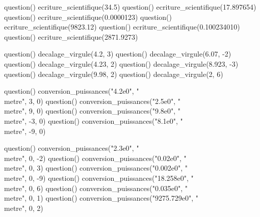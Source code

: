 \documentclass[../Cours.tex]{subfiles}
\begin{document}
\clearpage
\CORRECTIONS
\begin{questions}
    \vspace{-1.5em}
    \begin{multicols}{2}
    \begin{luacode}
        question() ecriture_scientifique(34.5)
        question() ecriture_scientifique(17.897654)
        question() ecriture_scientifique(0.0000123)
        question() ecriture_scientifique(9823.12)
        question() ecriture_scientifique(0.100234010)
        question() ecriture_scientifique(2871.9273)
    \end{luacode}
    \end{multicols}
    
    \vspace{-1.5em}
    \begin{multicols}{2}
    \begin{luacode}
        question() decalage_virgule(4.2, 3)
        question() decalage_virgule(6.07, -2)
        question() decalage_virgule(4.23, 2)
        question() decalage_virgule(8.923, -3)
        question() decalage_virgule(9.98, 2)
        question() decalage_virgule(2, 6)
    \end{luacode}
    \end{multicols}
    
    \begin{luacode}
        question() conversion_puissances("4.2e0", "\\metre", 3, 0)
        question() conversion_puissances("2.5e0", "\\metre", 9, 0)
        question() conversion_puissances("9.8e0", "\\metre", -3, 0)
        question() conversion_puissances("8.1e0", "\\metre", -9, 0)
    \end{luacode}
    
    \begin{luacode}
        question() conversion_puissances("2.3e0", "\\metre", 0, -2)
        question() conversion_puissances("0.02e0", "\\metre", 0, 3)
        question() conversion_puissances("0.002e0", "\\metre", 0, -9)
        question() conversion_puissances("18.258e0", "\\metre", 0, 6)
        question() conversion_puissances("0.035e0", "\\metre", 0, 1)
        question() conversion_puissances("9275.729e0", "\\metre", 0, 2)
    \end{luacode}
    

\end{questions}
\end{document}
